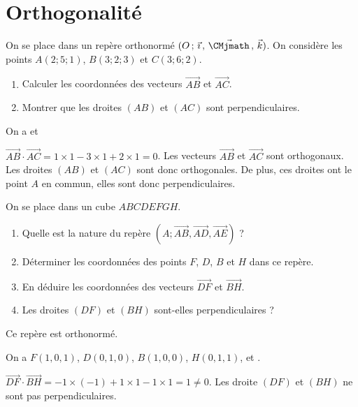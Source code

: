 \documentclass[11pt,fleqn, openany]{book} %
\begin{document}
\section*{Orthogonalité}

\begin{exercise}On se place dans un repère orthonormé $\Oijk$. On considère les points $A(2;5;1)$, $B(3;2;3)$ et $C(3;6;2)$.
\begin{enumerate}
\item Calculer les coordonnées des vecteurs $\overrightarrow{AB}$ et $\overrightarrow{AC}$.
\item Montrer que les droites $(AB)$ et $(AC)$ sont perpendiculaires.
\end{enumerate}\end{exercise}

\begin{solution}On a  et 

$\overrightarrow{AB} \cdot \overrightarrow{AC}= 1\times 1 -3 \times 1 +2 \times 1 =0$. Les vecteurs $\overrightarrow{AB}$ et $\overrightarrow{AC}$ sont orthogonaux. Les droites $(AB)$ et $(AC)$ sont donc orthogonales. De plus, ces droites ont le point $A$ en commun, elles sont donc perpendiculaires.\end{solution}

%

\begin{exercise}On se place dans un cube $ABCDEFGH$.
\begin{enumerate}
\item Quelle est la nature du repère $(A;\overrightarrow{AB},\overrightarrow{AD},\overrightarrow{AE})$ ?
\item Déterminer les coordonnées des points $F$, $D$, $B$ et $H$ dans ce repère.
\item En déduire les coordonnées des vecteurs $\overrightarrow{DF}$ et $\overrightarrow{BH}$.
\item Les droites $(DF)$ et $(BH)$ sont-elles perpendiculaires ?
\end{enumerate}\end{exercise}

\begin{solution}Ce repère est orthonormé.

On a $F(1,0,1)$, $D(0,1,0)$, $B(1,0,0)$, $H(0,1,1)$,  et .

 $\overrightarrow{DF}\cdot \overrightarrow{BH}=-1\times (-1) + 1 \times 1 -1\times 1 = 1 \neq 0$. Les droite $(DF)$ et $(BH)$ ne sont pas perpendiculaires.\end{solution}
 
\end{document}
